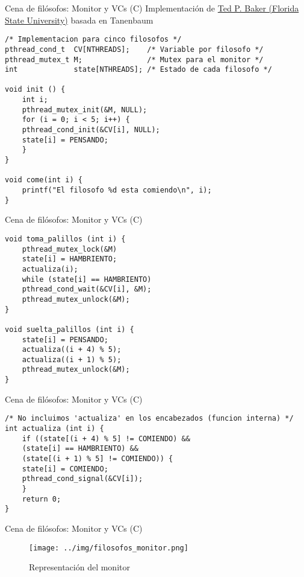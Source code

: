 \documentclass[presentation]{beamer}
\begin{document}
\begin{frame}[label={sec:orgcc6fe5c},fragile]{Cena de filósofos: Monitor y VCs (C)}
 Implementación de \href{http://www.cs.fsu.edu/\~baker/realtime/restricted/notes/philos.html}{Ted P. Baker (Florida State University)} basada en
Tanenbaum

\begin{verbatim}
/* Implementacion para cinco filosofos */
pthread_cond_t  CV[NTHREADS];    /* Variable por filosofo */
pthread_mutex_t M;               /* Mutex para el monitor */
int             state[NTHREADS]; /* Estado de cada filosofo */

void init () {
    int i;
    pthread_mutex_init(&M, NULL);
    for (i = 0; i < 5; i++) {
	pthread_cond_init(&CV[i], NULL);
	state[i] = PENSANDO;
    }
}

void come(int i) {
    printf("El filosofo %d esta comiendo\n", i);
}
\end{verbatim}
\end{frame}

\begin{frame}[label={sec:org92562ed},fragile]{Cena de filósofos: Monitor y VCs (C)}
 \begin{verbatim}
void toma_palillos (int i) {
    pthread_mutex_lock(&M)
    state[i] = HAMBRIENTO;
    actualiza(i);
    while (state[i] == HAMBRIENTO)
	pthread_cond_wait(&CV[i], &M);
    pthread_mutex_unlock(&M);
}

void suelta_palillos (int i) {
    state[i] = PENSANDO;
    actualiza((i + 4) % 5);
    actualiza((i + 1) % 5);
    pthread_mutex_unlock(&M);
}
\end{verbatim}
\end{frame}


\begin{frame}[label={sec:org896669e},fragile]{Cena de filósofos: Monitor y VCs (C)}
 \begin{verbatim}
/* No incluimos 'actualiza' en los encabezados (funcion interna) */
int actualiza (int i) {
    if ((state[(i + 4) % 5] != COMIENDO) &&
	(state[i] == HAMBRIENTO) &&
	(state[(i + 1) % 5] != COMIENDO)) {
	state[i] = COMIENDO;
	pthread_cond_signal(&CV[i]);
    }
    return 0;
}
\end{verbatim}
\end{frame}

\begin{frame}[label={sec:org9e108dd}]{Cena de filósofos: Monitor y VCs (C)}
\begin{figure}[htbp]
\centering
\texttt{[image: ../img/filosofos\_monitor.png]}
\caption{Representación del monitor}
\end{figure}
\end{frame}
\end{document}
